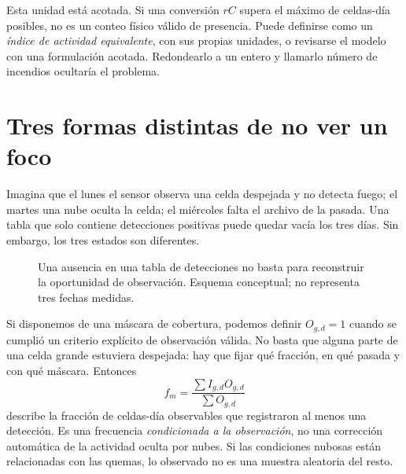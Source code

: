Esta unidad está acotada. Si una conversión $rC$ supera el máximo de celdas-día posibles,
no es un conteo físico válido de presencia. Puede definirse como un \emph{índice de actividad
equivalente}, con sus propias unidades, o revisarse el modelo con una formulación acotada.
Redondearlo a un entero y llamarlo número de incendios ocultaría el problema.

\FloatBarrier
\section{Tres formas distintas de no ver un foco}

Imagina que el lunes el sensor observa una celda despejada y no detecta fuego; el martes
una nube oculta la celda; el miércoles falta el archivo de la pasada. Una tabla que solo
contiene detecciones positivas puede quedar vacía los tres días. Sin embargo, los tres
estados son diferentes.

\begin{figure}[ht]
\centering
{}
\caption{Una ausencia en una tabla de detecciones no basta para reconstruir la oportunidad de
observación. Esquema conceptual; no representa tres fechas medidas.}
\label{fig:estados-cobertura}
\end{figure}

Si disponemos de una máscara de cobertura, podemos definir $O_{g,d}=1$ cuando se cumplió
un criterio explícito de observación válida. No basta que alguna parte de una celda grande
estuviera despejada: hay que fijar qué fracción, en qué pasada y con qué máscara. Entonces
\begin{equation}\label{eq:tasa-observada}
 f_m=\frac{\sum I_{g,d}O_{g,d}}{\sum O_{g,d}}
\end{equation}
describe la fracción de celdas-día observables que registraron al menos una detección.
Es una frecuencia \emph{condicionada a la observación}, no una corrección automática de la
actividad oculta por nubes. Si las condiciones nubosas están relacionadas con las quemas,
lo observado no es una muestra aleatoria del resto.

